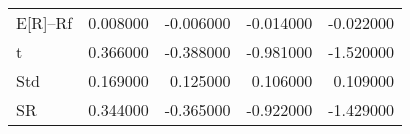 \begin{tabular}{lrrrr}
\toprule
\midrule
E[R]--Rf & 0.008000 & -0.006000 & -0.014000 & -0.022000 \\
t & 0.366000 & -0.388000 & -0.981000 & -1.520000 \\
Std & 0.169000 & 0.125000 & 0.106000 & 0.109000 \\
SR & 0.344000 & -0.365000 & -0.922000 & -1.429000 \\
\bottomrule
\end{tabular}
